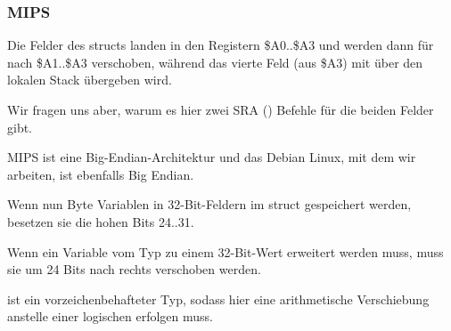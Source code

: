 \subsubsection{MIPS}
\label{MIPS_structure_big_endian}


Die Felder des structs landen in den Registern \$A0..\$A3 und werden dann für \printf nach \$A1..\$A3 verschoben,
während das vierte Feld (aus \$A3) mit  über den lokalen Stack übergeben wird.

Wir fragen uns aber, warum es hier zwei SRA () Befehle für die beiden \Tchar Felder gibt.

MIPS ist eine Big-Endian-Architektur und das Debian Linux, mit dem wir arbeiten, ist ebenfalls Big
Endian.

Wenn nun Byte Variablen in 32-Bit-Feldern im struct gespeichert werden, besetzen sie die hohen Bits 24..31.

Wenn ein Variable vom Typ \Tchar zu einem 32-Bit-Wert erweitert werden muss, muss sie um 24 Bits nach rechts verschoben
werden.

\Tchar ist ein vorzeichenbehafteter Typ, sodass hier eine arithmetische Verschiebung anstelle einer logischen erfolgen
muss.
